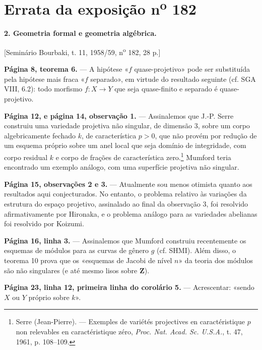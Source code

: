 \clearpage
\chapter*{Errata da exposição n\textsuperscript{o} 182}
\setcounter{footnote}{1}

\noindent\textbf{2. Geometria formal e geometria algébrica.}

\begin{center}
[Seminário Bourbaki, t. 11, 1958/59, n\textsuperscript{o} 182, 28 p.]
\end{center}

\noindent\textbf{Página 8, teorema 6.} --- A hipótese «$f$
quase-projetivo» pode ser substituída pela hipótese mais fraca «$f$
separado», em virtude do resultado seguinte (cf. SGA VIII, 6.2): todo morfismo
$f:X\longrightarrow Y$ que seja quase-finito e separado é quase-projetivo.

\noindent\textbf{Página 12, e página 14, observação 1.} --- Assinalemos que J.-P.
Serre construiu uma variedade projetiva não singular, de dimensão 3, sobre
um corpo algebricamente fechado $k$, de característica $p>0$, que não provém
por redução de um esquema próprio sobre um anel local que seja domínio de
integridade, com corpo residual $k$ e corpo de frações de característica
zero.\footnote{Serre (Jean-Pierre). --- Exemples de variétés projectives en
caractéristique $p$ non relevables en caractéristique zéro, \emph{Proc. Nat.
Acad. Sc. U.S.A.}, t. 47, 1961, p. 108--109.} Mumford teria encontrado um exemplo
análogo, com uma superfície projetiva não singular.

\noindent\textbf{Página 15, observações 2 e 3.} --- Atualmente sou menos
otimista quanto aos resultados aqui conjecturados. No entanto, o
problema relativo às variações da estrutura do espaço projetivo,
assinalado ao final da observação 3, foi resolvido afirmativamente por
Hironaka, e o problema análogo para as variedades abelianas foi resolvido
por Koizumi.

\noindent\textbf{Página 16, linha 3.} --- Assinalemos que Mumford construiu
recentemente os esquemas de módulos para as curvas de gênero $g$ (cf. SHMI).
Além disso, o teorema 10 prova que os «esquemas de Jacobi de nível $n$»
da teoria dos módulos são não singulares (e até mesmo lisos sobre $\mathbf Z$).

\noindent\textbf{Página 23, linha 12, primeira linha do corolário
5.} --- Acrescentar: «sendo $X$ ou $Y$ próprio sobre $k$».


